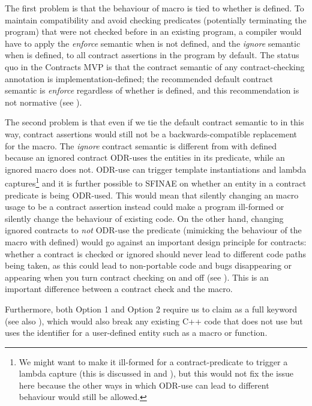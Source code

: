 The first problem is that the behaviour of macro  is tied to whether  is defined. To maintain compatibility and avoid checking predicates (potentially terminating the program) that were not checked before in an existing program, a compiler would have to apply the \emph{enforce} semantic when  is not defined, and the \emph{ignore} semantic when  is defined, to all contract assertions in the program by default. The status quo in the Contracts MVP is that the contract semantic of any contract-checking annotation is implementation-defined; the recommended default contract semantic is \emph{enforce} regardless of whether  is defined, and this recommendation is not normative (see \cite{P2877R0}).

The second problem is that even if we tie the default contract semantic to  in this way, contract assertions would still not be a backwards-compatible replacement for the  macro. The \emph{ignore} contract semantic is different from  with  defined because an ignored contract ODR-uses the entities in its predicate, while an ignored  macro does not. ODR-use can trigger template instantiations and lambda captures\footnote{We might want to make it ill-formed for a contract-predicate to trigger a lambda capture (this is discussed in \cite{P2834R1} and \cite{P2890R0}), but this would not fix the issue here because the other ways in which ODR-use can lead to different behaviour would still be allowed.} and it is further possible to SFINAE on whether an entity in a contract predicate is being ODR-used. This would mean that silently changing an  macro usage to be a contract assertion instead could make a program ill-formed or silently change the behaviour of existing code. On the other hand, changing ignored contracts to \emph{not} ODR-use the predicate (mimicking the behaviour of the  macro with  defined) would go against an important design principle for contracts: whether a contract is checked or ignored should never lead to different code paths being taken, as this could lead to non-portable code and bugs disappearing or appearing when you turn contract checking on and off (see \cite{P2834R1}). This is an important difference between a contract check and the  macro.

Furthermore, both Option 1 and Option 2 require us to claim  as a full keyword (see also \cite{P2884R0}), which would also break any existing C++ code that does not use  but uses the identifier  for a user-defined entity such as a macro or function.

